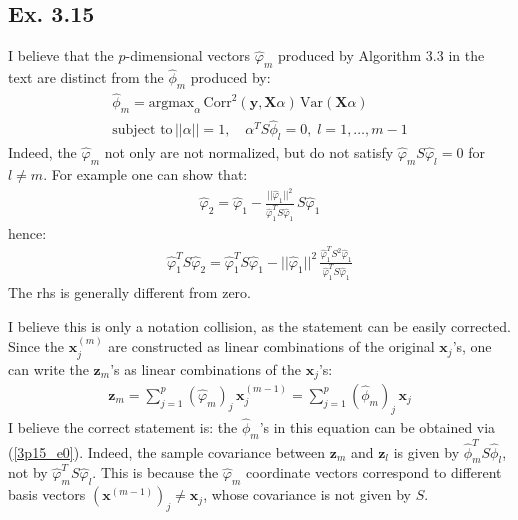 \subsection*{Ex. 3.15}
I believe that the $p$-dimensional vectors $\hat{\varphi}_m$ produced by Algorithm 3.3 in the text are distinct from the $\hat{\phi}_m$ produced by:
\begin{eqnarray} \label{3p15_e0}
\hat{\phi}_m  =  \textrm{argmax}_\alpha\, \textrm{Corr}^2 \left( \mathbf{y}, \mathbf{X} \alpha \right)\, \textrm{Var} \left( \mathbf{X} \alpha \right)\\ \nonumber
\textrm{subject to} \, ||\alpha|| = 1, \quad \alpha^T S \hat{\phi}_l = 0, \;l = 1, \ldots, m - 1
\end{eqnarray}
Indeed, the $\hat{\varphi}_m$ not only are not normalized, but do not satisfy $ \hat{\varphi}_m S \hat{\varphi}_l = 0$ for $l \neq m$. For example one can show that:
\begin{eqnarray*}
\hat{\varphi}_2 = \hat{\varphi}_1 - \frac{||\hat{\varphi}_1||^2}{\hat{\varphi}_1^T S \hat{\varphi}_1}\, S \hat{\varphi}_1
\end{eqnarray*}
hence:
\begin{eqnarray*}
\hat{\varphi}_1^T S \hat{\varphi}_2 = \hat{\varphi}_1^T S \hat{\varphi}_1 - ||\hat{\varphi}_1||^2 \, \frac{\hat{\varphi}_1^T S^2 \hat{\varphi}_1}{\hat{\varphi}_1^T S \hat{\varphi}_1}
\end{eqnarray*}
The rhs is generally different from zero. 

I believe this is only a notation collision, as the statement can be easily corrected.
Since the $\mathbf{x}_j^{(m)}$ are constructed as linear combinations of the original $\mathbf{x}_j$'s, one can write the $\mathbf{z}_m$'s as linear combinations of the $\mathbf{x}_j$'s:
\begin{eqnarray}  \label{3p15_e1}
\mathbf{z}_m  =   \sum_{j = 1}^p \left( \hat{\varphi}_m \right)_j  \, \mathbf{x}^{(m-1)}_j= \sum_{j = 1}^p \left( \hat{\phi}_m \right)_j \, \mathbf{x}_j
\end{eqnarray}
I believe the correct statement is: the $\hat{\phi}_m$'s in this equation can be obtained via (\ref{3p15_e0}). Indeed, the
sample covariance between $\mathbf{z}_m$ and $\mathbf{z}_l$ is given 
by $\hat{\phi}_m^T S \hat{\phi}_l$, not by $\hat{\varphi}_m^T S \hat{\varphi}_l$. This is because the $\hat{\varphi}_m$ coordinate vectors correspond to different basis vectors $(\mathbf{x}^{(m-1)})_j \neq \mathbf{x}_j$, whose
covariance is not given by $S$.

